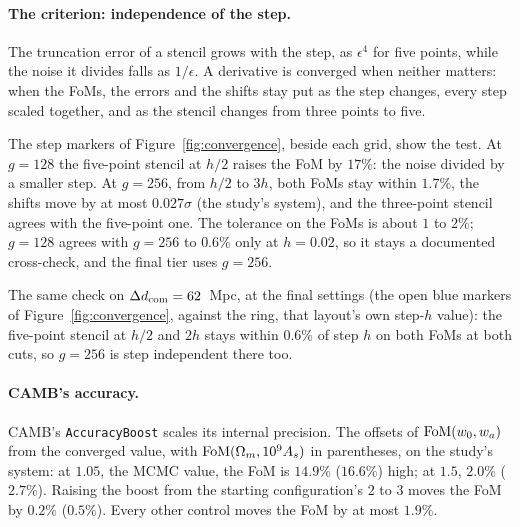 \documentclass[11pt]{article}
\begin{document}
\paragraph{The criterion: independence of the step.}
The truncation error of a stencil grows with the step, as $\epsilon^4$
for five points, while the noise it divides falls as $1/\epsilon$.  A
derivative is converged when neither matters: when the FoMs, the errors
and the shifts stay put as the step changes, every step scaled
together, and as the stencil changes from three points to five.

The step markers of Figure~\ref{fig:convergence}, beside each grid,
show the test.  At $g = 128$ the five-point stencil at $h/2$ raises the
FoM by $17\%$:
the noise divided by a smaller step.  At $g = 256$, from $h/2$ to $3h$,
both FoMs stay within $1.7\%$, the shifts move by at most $0.027\sigma$
(the study's system), and the three-point stencil agrees with the
five-point one.  The
tolerance on the FoMs is about $1$ to $2\%$; $g = 128$ agrees with
$g = 256$ to $0.6\%$ only at $h = 0.02$, so it stays a documented
cross-check, and the final tier uses $g = 256$.

The same check on $\Delta d_{\rm com} = 62$~Mpc, at the final settings
(the open blue markers of Figure~\ref{fig:convergence}, against the
ring, that layout's own step-$h$ value):
the five-point stencil at $h/2$ and $2h$ stays within $0.6\%$ of step
$h$ on both FoMs at both cuts, so $g = 256$ is
step independent there too.

\paragraph{CAMB's accuracy.}
CAMB's \texttt{AccuracyBoost} scales its internal precision.  The
offsets of ${\rm FoM}(w_0, w_a)$ from the converged value, with
${\rm FoM}(\Omega_m, 10^9 A_s)$ in parentheses, on the study's system:
at $1.05$, the MCMC
value, the FoM is $14.9\%$ ($16.6\%$) high; at $1.5$, $2.0\%$
($2.7\%$).  Raising the boost from the starting configuration's $2$ to
$3$ moves the FoM by $0.2\%$ ($0.5\%$).  Every other control moves the
FoM by at most $1.9\%$.
\end{document}
